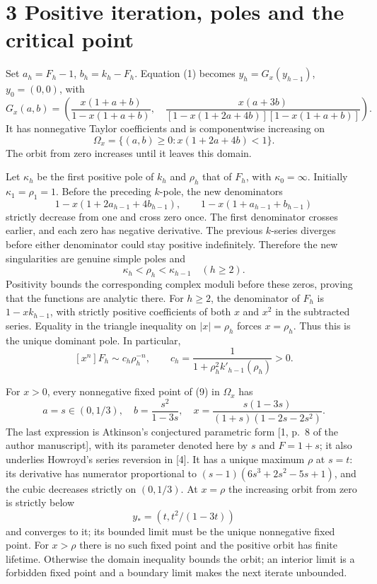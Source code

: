 \documentclass[11pt,letterpaper]{article}
\begin{document}
\section{3 Positive iteration, poles and the critical
point}\label{positive-iteration-poles-and-the-critical-point}

Set \(a_h=F_h-1\), \(b_h=k_h-F_h\). Equation (1) becomes
\(y_h=G_x(y_{h-1})\), \(y_0=(0,0)\), with \[
 G_x(a,b)=\left(\frac{x(1+a+b)}{1-x(1+a+b)},\quad
 \frac{x(a+3b)}{[1-x(1+2a+4b)][1-x(1+a+b)]}\right).             \tag{9}
\] It has nonnegative Taylor coefficients and is componentwise
increasing on \[\Omega_x=\{(a,b)\ge0:x(1+2a+4b)<1\}.\] The orbit from
zero increases until it leaves this domain.

Let \(\kappa_h\) be the first positive pole of \(k_h\) and \(\rho_h\)
that of \(F_h\), with \(\kappa_0=\infty\). Initially
\(\kappa_1=\rho_1=1\). Before the preceding \(k\)-pole, the new
denominators \[1-x(1+2a_{h-1}+4b_{h-1}),\qquad 1-x(1+a_{h-1}+b_{h-1})\]
strictly decrease from one and cross zero once. The first denominator
crosses earlier, and each zero has negative derivative. The previous
\(k\)-series diverges before either denominator could stay positive
indefinitely. Therefore the new singularities are genuine simple poles
and
\[\kappa_h<\rho_h<\kappa_{h-1}\quad(h\ge2).                    \tag{10}\]
Positivity bounds the corresponding complex moduli before these zeros,
proving that the functions are analytic there. For \(h\ge2\), the
denominator of \(F_h\) is \(1-xk_{h-1}\), with strictly positive
coefficients of both \(x\) and \(x^2\) in the subtracted series.
Equality in the triangle inequality on \(|x|=\rho_h\) forces
\(x=\rho_h\). Thus this is the unique dominant pole. In particular, \[
 [x^n]F_h\sim c_h\rho_h^{-n},\qquad
 c_h=\frac1{1+\rho_h^2k'_{h-1}(\rho_h)}>0.                    \tag{11}
\]

For \(x>0\), every nonnegative fixed point of (9) in \(\Omega_x\) has \[
 a=s\in(0,1/3),\quad b=\frac{s^2}{1-3s},\quad
 x=\frac{s(1-3s)}{(1+s)(1-2s-2s^2)}.                         \tag{12}
\] The last expression is Atkinson's conjectured parametric form {[}1,
p.~8 of the author manuscript{]}, with its parameter denoted here by
\(s\) and \(F=1+s\); it also underlies Howroyd's series reversion in
{[}4{]}. It has a unique maximum \(\rho\) at \(s=t\): its derivative has
numerator proportional to \((s-1)(6s^3+2s^2-5s+1)\), and the cubic
decreases strictly on \((0,1/3)\). At \(x=\rho\) the increasing orbit
from zero is strictly below \[y_*=(t,t^2/(1-3t))\] and converges to it;
its bounded limit must be the unique nonnegative fixed point. For
\(x>\rho\) there is no such fixed point and the positive orbit has
finite lifetime. Otherwise the domain inequality bounds the orbit; an
interior limit is a forbidden fixed point and a boundary limit makes the
next iterate unbounded.
\end{document}
